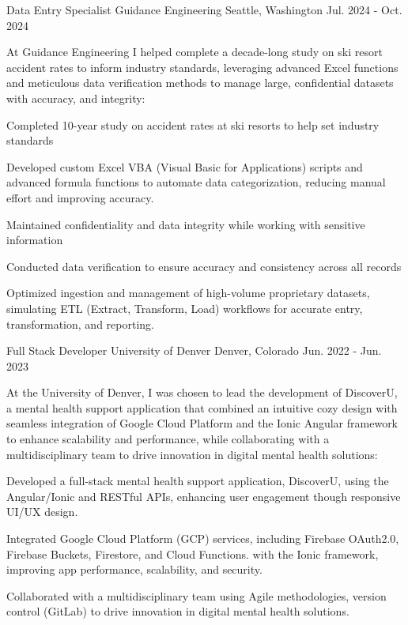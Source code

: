 \begin{cventries}
  \cventry
    {Data Entry Specialist} %
    {Guidance Engineering} %
    {Seattle, Washington} %
    {Jul. 2024 - Oct. 2024} %
    {
      At Guidance Engineering I helped complete a decade-long study on ski resort accident rates to inform industry standards, leveraging advanced Excel functions and meticulous data verification methods to manage large, confidential datasets with accuracy, and integrity:
      \begin{cvitems} %
        \item []
        \item Completed 10-year study on accident rates at ski resorts to help set industry standards
        \item Developed custom Excel VBA (Visual Basic for Applications) scripts and advanced formula functions to automate data categorization, reducing manual effort and improving accuracy.
        \item Maintained confidentiality and data integrity while working with sensitive information
        \item Conducted data verification to ensure accuracy and consistency across all records
        \item Optimized ingestion and management of high-volume proprietary datasets, simulating ETL (Extract, Transform, Load) workflows for accurate entry, transformation, and reporting.
      \end{cvitems}
    }

  \cventry
    {Full Stack Developer} %
    {University of Denver} %
    {Denver, Colorado} %
    {Jun. 2022 - Jun. 2023} %
    {
      At the University of Denver, I was chosen to lead the development of DiscoverU, a mental health support application that combined an intuitive cozy design with seamless integration of Google Cloud Platform and the Ionic Angular framework to enhance scalability and performance, while collaborating with a multidisciplinary team to drive innovation in digital mental health solutions:
      \begin{cvitems}
        \item []
        \item Developed a full-stack mental health support application, DiscoverU, using the Angular/Ionic and RESTful APIs, enhancing user engagement though responsive UI/UX design.
        \item Integrated Google Cloud Platform (GCP) services, including Firebase OAuth2.0, Firebase Buckets, Firestore, and Cloud Functions. with the Ionic framework, improving app performance, scalability, and security.
        \item Collaborated with a multidisciplinary team using Agile methodologies, version control (GitLab) to drive innovation in digital mental health solutions.
      \end{cvitems}
    }


\end{cventries}
